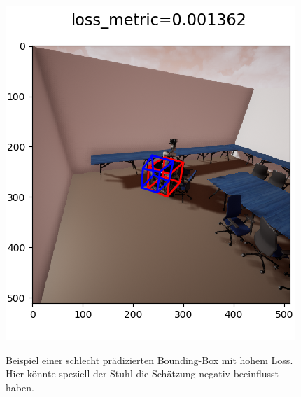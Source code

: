 \begin{figure}[!htb]
\begin{minipage}[b]{.5\linewidth}
      \includegraphics[width=\linewidth]{bbs/schlecht.png}
      \label{vdiffX_unsymm} 
      \caption{Beispiel einer schlecht prädizierten Bounding-Box mit hohem Loss. Hier könnte speziell der Stuhl die Schätzung negativ beeinflusst haben.}
   \end{minipage}
\end{figure}
\newpage